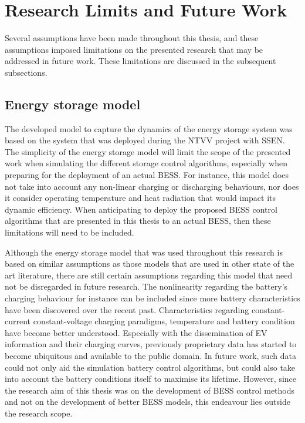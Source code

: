 \section{Research Limits and Future Work}
\label{ch-conclusions:sec:research-limits-and-future-work}

Several assumptions have been made throughout this thesis, and these assumptions imposed limitations on the presented research that may be addressed in future work.
These limitations are discussed in the subsequent subsections.

\subsection{Energy storage model}

The developed model to capture the dynamics of the energy storage system was based on the system that was deployed during the NTVV project with SSEN.
The simplicity of the energy storage model will limit the scope of the presented work when simulating the different storage control algorithms, especially when preparing for the deployment of an actual BESS.
For instance, this model does not take into account any non-linear charging or discharging behaviours, nor does it consider operating temperature and heat radiation that would impact its dynamic efficiency.
When anticipating to deploy the proposed BESS control algorithms that are presented in this thesis to an actual BESS, then these limitations will need to be included.

Although the energy storage model that was used throughout this research is based on similar assumptions as those models that are used in other state of the art literature, there are still certain assumptions regarding this model that need not be disregarded in future research.
The nonlinearity regarding the battery's charging behaviour for instance can be included since more battery characteristics have been discovered over the recent past.
Characteristics regarding constant-current constant-voltage charging paradigms, temperature and battery condition have become better understood.
Especially with the dissemination of EV information and their charging curves, previously proprietary data has started to become ubiquitous and available to the public domain.
In future work, such data could not only aid the simulation battery control algorithms, but could also take into account the battery conditions itself to maximise its lifetime.
However, since the research aim of this thesis was on the development of BESS control methods and not on the development of better BESS models, this endeavour lies outside the research scope.

